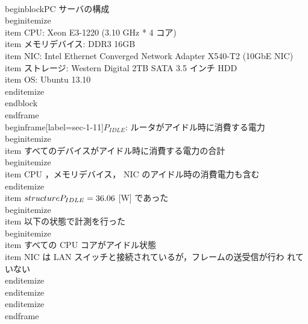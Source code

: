 {\\begin{block}{PC サーバの構成}%
\\begin{itemize}
\\item CPU: Xeon E3-1220 (3.10 GHz * 4 コア)
\\item メモリデバイス: DDR3 16GB
\\item NIC: Intel Ethernet Converged Network Adapter X540-T2 (10GbE NIC)
\\item ストレージ: Western Digital 2TB SATA 3.5 インチ HDD
\\item OS: Ubuntu 13.10
\\end{itemize}
\\end{block}
\\end{frame}
\\begin{frame}[label=sec-1-11]{$P_{IDLE}$: ルータがアイドル時に消費する電力}
\\begin{itemize}
\\item すべてのデバイスがアイドル時に消費する電力の合計
\\begin{itemize}
\\item CPU ，メモリデバイス， NIC のアイドル時の消費電力も含む
\\end{itemize}
\\item $\\structure{P_{IDLE}} =  36.06$ [W] であった
\\begin{itemize}
\\item 以下の状態で計測を行った
\\begin{itemize}
\\item すべての CPU コアがアイドル状態
\\item NIC は LAN スイッチと接続されているが，フレームの送受信が行わ
れていない
\\end{itemize}
\\end{itemize}
\\end{itemize}
\\end{frame}

}
